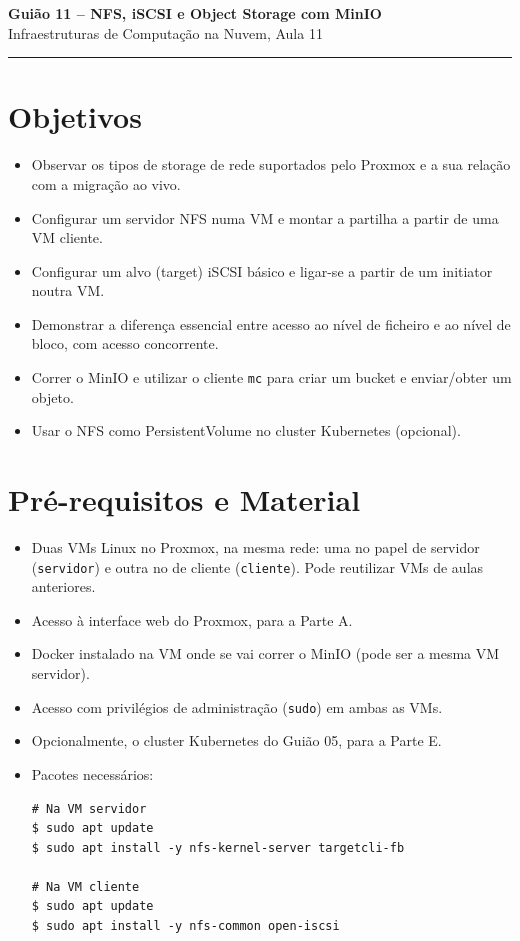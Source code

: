 \documentclass[11pt,a4paper]{article}
\newcommand{\guiaotitle}[2]{%
  \begin{center}
  {\Large\bfseries\color{TextEspresso} #1}\\[0.3cm]
  {\normalsize\color{NudeTaupe} #2}\\[0.2cm]
  {\color{NudeTaupe}\rule{4cm}{0.5pt}}
  \end{center}
  \vspace{0.5cm}
}
\begin{document}
\guiaotitle{Guião 11 -- NFS, iSCSI e Object Storage com MinIO}{Infraestruturas de Computação na Nuvem, Aula 11}

\section{Objetivos}
\begin{itemize}
    \setlength\itemsep{0.2cm}
    \item Observar os tipos de storage de rede suportados pelo Proxmox e a sua relação com a migração ao vivo.
    \item Configurar um servidor NFS numa VM e montar a partilha a partir de uma VM cliente.
    \item Configurar um alvo (target) iSCSI básico e ligar-se a partir de um initiator noutra VM.
    \item Demonstrar a diferença essencial entre acesso ao nível de ficheiro e ao nível de bloco, com acesso concorrente.
    \item Correr o MinIO e utilizar o cliente \texttt{mc} para criar um bucket e enviar/obter um objeto.
    \item Usar o NFS como PersistentVolume no cluster Kubernetes (opcional).
\end{itemize}

\section{Pré-requisitos e Material}
\begin{itemize}
    \setlength\itemsep{0.2cm}
    \item Duas VMs Linux no Proxmox, na mesma rede: uma no papel de servidor
    (\texttt{servidor}) e outra no de cliente (\texttt{cliente}). Pode reutilizar VMs
    de aulas anteriores.
    \item Acesso à interface web do Proxmox, para a Parte A.
    \item Docker instalado na VM onde se vai correr o MinIO (pode ser a mesma VM servidor).
    \item Acesso com privilégios de administração (\texttt{sudo}) em ambas as VMs.
    \item Opcionalmente, o cluster Kubernetes do Guião 05, para a Parte E.
    \item Pacotes necessários:
\begin{lstlisting}
# Na VM servidor
$ sudo apt update
$ sudo apt install -y nfs-kernel-server targetcli-fb

# Na VM cliente
$ sudo apt update
$ sudo apt install -y nfs-common open-iscsi
\end{lstlisting}
\end{itemize}
\end{document}

